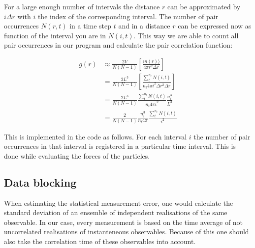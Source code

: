 \documentclass[
10pt, %
a4paper, %
oneside, %
headinclude,footinclude, %
BCOR5mm, %
]{scrartcl}
\newcommand{\insertcode}[2]{\begin{itemize}\item[]\end{itemize}} %
\begin{document}
\noindent
For a large enough number of intervals the distance $r$ can be approximated by $i\Delta r$ with $i$ the index of the corresponding interval. The number of pair occurrences $N(r,t)$ in a time step $t$ and in a distance $r$ can be expressed now as function of the interval you are in $N(i,t)$. This way we are able to count all pair occurrences in our program and calculate the pair correlation function:

\begin{align}
g(r) &\approx \frac{2V}{N(N-1)} \left [ \frac{\langle n(r) \rangle }{ 4 \pi r^2 \Delta r} \right ] \\
&= \frac{2L^3}{N(N-1)} \left [ \frac{\sum_t^{n_t} N(i,t)}{n_t 4 \pi i^2 \Delta r^2 \Delta r} \right ] \\
&= \frac{2L^3}{N(N-1)} \frac{\sum_t^{n_t} N(i,t)}{n_t 4 \pi i^2} \frac{n_i^3}{L^3} \\
&= \frac{2}{N(N-1)} \frac{n_i^3}{n_t 4 \pi} \frac{\sum_t^{n_t} N(i,t)}{i^2}
\end{align}

\noindent
This is implemented in the code as follows. For each interval $i$ the number of pair occurrences in that interval is registered in a particular time interval. This is done while evaluating the forces of the particles.



\subsection{Data blocking}

When estimating the statistical measurement error, one would calculate the standard deviation of an ensemble of independent realisations of the same observable. In our case, every measurement is based on the time average of not uncorrelated realisations of instanteneous observables. Because of this one should also take the correlation time of these observables into account. 
\end{document}
